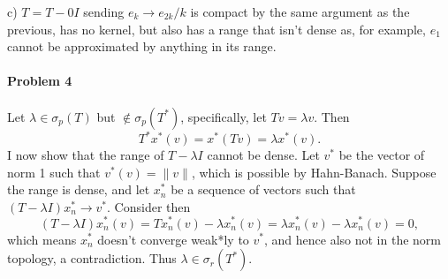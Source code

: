 \documentclass[12pt]{article}
\newcommand{\s}{\sigma}
\renewcommand{\l}{\lambda}
\begin{document}
c) $T = T- 0I$ sending $e_k \to e_{2k}/k$ is compact by the same
argument as the previous, has no kernel, but also has a range that isn't dense
as, for example, $e_1$ cannot be approximated by anything in its range.

\paragraph{Problem 4}
Let $\l \in \s_p(T)$ but $\notin \s_p(T^*)$, specifically, let $Tv = \l v$. Then
\begin{displaymath}
  T^*x^*(v) = x^*(Tv) = \lambda x^*(v).
\end{displaymath}
I now show that the range of $T-\l I$ cannot be dense. Let $v^*$ be the vector
of norm 1 such that $v^*(v) = \|v\|$, which is possible by Hahn-Banach. Suppose
the range is dense, and let $x_n^*$ be a sequence of vectors such that
$(T-\l I)x_n^*\to v^*$. Consider then
\begin{displaymath}
  (T-\l I)x_n^*(v) = Tx_n^*(v)-\l x_n^*(v) = \l x_n^*(v)-\l x_n^*(v) = 0,
\end{displaymath}
which means $x^*_n$ doesn't converge weak*ly to $v^*$, and hence also not in the
norm topology, a contradiction. Thus $\l \in \s_r(T^*)$.
\end{document}
